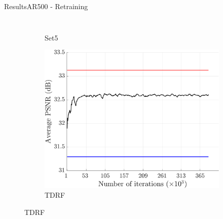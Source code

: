 \begin{frame}{Results}{AR500 - Retraining}
\begin{columns}
\begin{figure}
\begin{subfigure}[b]{0.48\textwidth}
                \vspace*{-2mm}
                \caption*{\scriptsize Set5}
            \end{subfigure}
            \begin{subfigure}[b]{0.48\textwidth}
                \includegraphics[width=\textwidth]{sections/malte_slides/915-results-TDRF.pdf}
                \vspace*{-2mm}
                \caption*{\scriptsize TDRF}
            \end{subfigure}
        \end{figure}

    \end{columns}
\end{frame}

